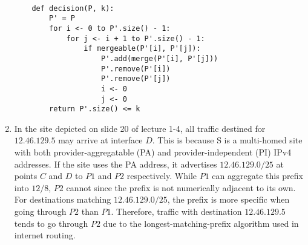 \documentclass[12pt]{article}
\begin{document}
\begin{enumerate}
\begin{verbatim}
    
    def decision(P, k):
        P' = P
        for i <- 0 to P'.size() - 1:
            for j <- i + 1 to P'.size() - 1:
                if mergeable(P'[i], P'[j]):
                    P'.add(merge(P'[i], P'[j]))
                    P'.remove(P'[i])
                    P'.remove(P'[j])
                    i <- 0
                    j <- 0
        return P'.size() <= k    					
    \end{verbatim}
  
	\item In the site depicted on slide 20 of lecture 1-4, all traffic destined for $12.46.129.5$ may arrive at interface $D$. This is because S is a multi-homed site with both provider-aggregatable (PA) and provider-independent (PI) IPv4 addresses. If the site uses the PA address, it advertises $12.46.129.0/25$ at points $C$ and $D$ to $P1$ and $P2$ respectively. While $P1$ can aggregate this prefix into $12/8$, $P2$ cannot since the prefix is not numerically adjacent to its own. For destinations matching $12.46.129.0/25$, the prefix is more specific when going through $P2$ than $P1$. Therefore, traffic with destination $12.46.129.5$ tends to go through $P2$ due to the longest-matching-prefix algorithm used in internet routing. \\
	

\end{enumerate}
\end{document}
